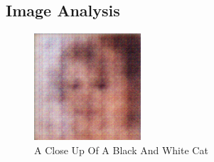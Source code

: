 \documentclass{article}%
\begin{document}
%
\subsection{Image Analysis}%
\label{subsec:ImageAnalysis}%


\begin{figure}[h!]%
\centering%
\includegraphics[width=150px]{500_fake_images/samples_5_385.png}%
\caption{A Close Up Of A Black And White Cat}%
\end{figure}

%
\end{document}
